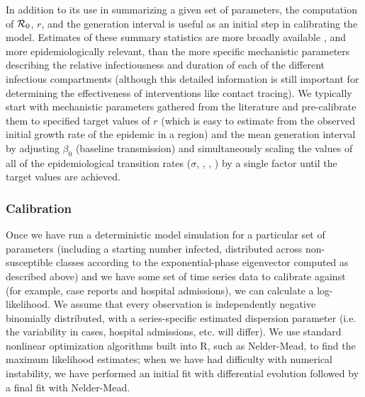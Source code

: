 \documentclass[12pt]{article}\usepackage[]{graphicx}\usepackage[]{color}
\begin{document}

In addition to its use in summarizing a given set of parameters, the computation of ${\mathcal R}_0$, $r$, and the generation interval is useful as an initial step in calibrating the model. Estimates of these summary statistics are more broadly available , and more epidemiologically relevant, than the more specific mechanistic parameters describing the relative infectiousness and duration of each of the different infectious compartments (although this detailed information is still important for determining the effectiveness of interventions like contact tracing). We typically start with mechanistic parameters gathered from the literature and pre-calibrate them to specified target values of $r$ (which is easy to estimate from the observed initial growth rate of the epidemic in a region) and the mean generation interval by adjusting $\beta_0$ (baseline transmission) and simultaneously scaling the values of all of the epidemiological transition rates ($\sigma$, , , ) by a single factor until the target values are achieved.

\subsubsection*{Calibration}

Once we have run a deterministic model simulation for a particular
set of parameters (including a starting number infected, distributed
across non-susceptible classes according to the exponential-phase eigenvector
computed as described above) and we have some set of time series data to
calibrate against (for example, case reports and hospital admissions),
we can calculate a log-likelihood. We assume that every observation
is independently negative binomially distributed, with a series-specific
estimated dispersion parameter (i.e. the variability in cases, hospital
admissions, etc. will differ). We use standard nonlinear optimization
algorithms built into R, such as Nelder-Mead, to find the maximum likelihood
estimates; when we have had difficulty with numerical instability, we
have performed an initial fit with differential evolution
\cite{Mull+11} followed by a final fit with Nelder-Mead.
\end{document}

